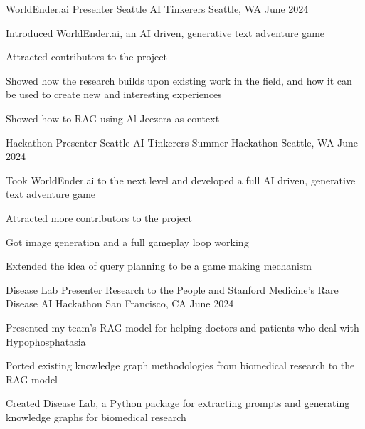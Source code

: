 

\begin{cventries}

  \cventry
    {WorldEnder.ai Presenter} %
    {Seattle AI Tinkerers} %
    {Seattle, WA} %
    {June 2024} %
    {
      \begin{cvitems} %
        \item {Introduced WorldEnder.ai, an AI driven, generative text adventure game}
        \item {Attracted contributors to the project}
        \item {Showed how the research builds upon existing work in the field, and how it can be used to create new and interesting experiences}
        \item {Showed how to RAG using Al Jeezera as context}
      \end{cvitems}
    }

  \cventry
    {Hackathon Presenter} %
    {Seattle AI Tinkerers Summer Hackathon} %
    {Seattle, WA} %
    {June 2024} %
    {
      \begin{cvitems} %
        \item {Took WorldEnder.ai to the next level and developed a full AI driven, generative text adventure game}
        \item {Attracted more contributors to the project}
        \item {Got image generation and a full gameplay loop working}
        \item {Extended the idea of query planning to be a game making mechanism}
      \end{cvitems}
    }

  \cventry
    {Disease Lab Presenter} %
    {Research to the People and Stanford Medicine's Rare Disease AI Hackathon} %
    {San Francisco, CA} %
    {June 2024} %
    {
      \begin{cvitems} %
        \item {Presented my team's RAG model for helping doctors and patients who deal with Hypophosphatasia}
        \item {Ported existing knowledge graph methodologies from biomedical research to the RAG model}
        \item {Created Disease Lab, a Python package for extracting prompts and generating knowledge graphs for biomedical research}
      \end{cvitems}
    }

\end{cventries}
